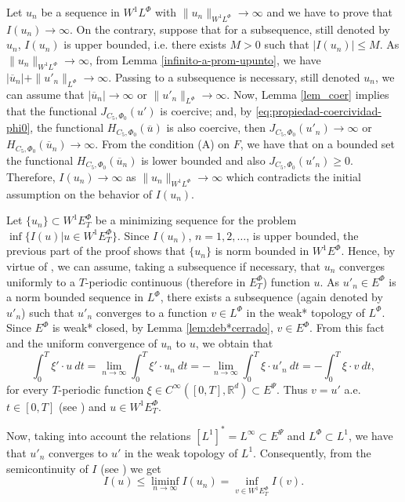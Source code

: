 \documentclass[twoside]{article}
\theoremstyle{remark}
\newcommand{\orlnor}{\|_{L^{\Phi}}}
\newcommand{\lphi}{L^{\Phi}}
\newcommand{\ephi}{E^{\Phi}}
\newcommand{\wphi}{W^{1}\lphi}
\newcommand{\wphiet}{W^{1}\ephi_T}
\newcommand{\wphie}{W^{1}\ephi}
\newcommand{\sobnor}{\|_{W^{1}\lphi}}
\newcommand{\rr}{\mathbb{R}}
\renewcommand{\leq}{\leqslant}
\renewcommand{\geq}{\geqslant}
\newcommand{\epsi}{E^{\Psi}}
\begin{document}
Let $u_n$ be  a sequence in $\wphi$ with
$\|u_n\sobnor\to\infty$ and we have to prove that $I(u_n)\to\infty$.
On the contrary, suppose  that for a subsequence,
still denoted by $u_n$, $I(u_n)$ is upper bounded, i.e. there exists $M>0$ such that $|I(u_{n})|\leq M$.
As $\|u_n\sobnor\to\infty$, from Lemma \ref{infinito-a-prom-upunto},  we have $|\overline{u}_n|+\|u'_n\orlnor\to \infty$. Passing to a subsequence is necessary, still denoted $u_n$, we can assume that $|\overline{u}_n|\to \infty$ or $\|u'_n\orlnor\to \infty$.
Now, Lemma \ref{lem_coer} implies that the functional $J_{C_5,\Phi_0}(u')$ is coercive;
and, by \eqref{eq:propiedad-coercividad-phi0},
the functional $H_{C_5,\Phi_0}(\overline{u})$ is also coercive, then
$J_{C_5,\Phi_0}(u'_n) \to \infty$ or $H_{C_5,\Phi_0}(\overline{u}_n)\to \infty$.
From the condition (A) on $F$, we have that on a bounded set the functional $H_{C_5,\Phi_0}(\overline{u}_n)$ is lower bounded and
also $J_{C_5,\Phi_0}(u'_n)\geq 0$.
Therefore,  $I(u_n)\to\infty$ as $\|u_n\sobnor\to\infty$ which contradicts the initial assumption on the behavior of $I(u_n)$.

Let $\{u_n\}\subset \wphiet$  be a  minimizing sequence for the problem  $\inf\{I(u)|u\in\wphiet\}$.
Since  $I(u_n)$, $n=1,2,\ldots$,  is upper bounded, the previous part of the proof shows that $\{u_n\}$ is norm bounded in $\wphie$. Hence, by virtue of  \cite[Cor. 2.2]{ABGMS2015}, we can assume, taking a subsequence if necessary, that $u_n$ converges uniformly to a $T$-periodic continuous (therefore in $\ephi_T$)  function $u$. As $u'_n \in \ephi$ is a norm bounded sequence in $\lphi$,
there exists a subsequence (again denoted by $u'_n$) such that $u'_n$ converges to a function $v\in\lphi$ in the weak* topology of $\lphi$.
Since $\ephi$ is weak* closed, by Lemma \ref{lem:deb*cerrado}, $v\in \ephi$. From this fact and the uniform convergence of $u_n$ to $u$, we obtain that
\[
\int_0^T\xi'\cdot u\ dt=\lim_{n\to\infty}\int_0^T\xi'\cdot u_n \ dt=
-\lim_{n\to\infty}\int_0^T\xi\cdot u'_n\ dt=-\int_0^T\xi\cdot v\ dt,
\]
for every $T$-periodic function $\xi\in C^{\infty}([0,T],\rr^d)\subset\epsi$.
Thus $v=u'$ a.e. $t\in [0,T]$ (see \cite[p. 6]{mawhin2010critical}) and $u\in\wphiet$.

Now, taking into account the relations $\left[L^1\right]^*=L^{\infty}\subset  \epsi$ and $\lphi\subset L^1$, we have that $u'_n$ converges to $u'$ in the weak topology of $L^1$. Consequently,  from the semicontinuity of $I$ (see \cite[Lemma 6.1]{ABGMS2015})  we get 
\[I(u)\leq  \liminf_{n\to\infty}I(u_n)=\inf\limits_{v\in\wphie_T}I(v).\]
\end{document}
